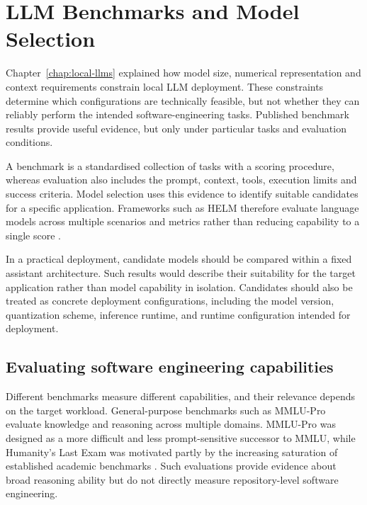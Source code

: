 \chapter{LLM Benchmarks and Model Selection}
\label{chap:benchmarks}

Chapter~\ref{chap:local-llms} explained how model size, numerical representation and context requirements constrain local LLM deployment. These constraints determine which configurations are technically feasible, but not whether they can reliably perform the intended software-engineering tasks. Published benchmark results provide useful evidence, but only under particular tasks and evaluation conditions.

A benchmark is a standardised collection of tasks with a scoring procedure, whereas evaluation also includes the prompt, context, tools, execution limits and success criteria. Model selection uses this evidence to identify suitable candidates for a specific application. Frameworks such as HELM therefore evaluate language models across multiple scenarios and metrics rather than reducing capability to a single score \parencite{liang2022helm}.

In a practical deployment, candidate models should be compared within a fixed assistant architecture. Such results would describe their suitability for the target application rather than model capability in isolation. Candidates should also be treated as concrete deployment configurations, including the model version, quantization scheme, inference runtime, and runtime configuration intended for deployment.

\section{Evaluating software engineering capabilities}
\label{sec:engineering-capabilities}

Different benchmarks measure different capabilities, and their relevance depends on the target workload. General-purpose benchmarks such as MMLU-Pro evaluate knowledge and reasoning across multiple domains. MMLU-Pro was designed as a more difficult and less prompt-sensitive successor to MMLU, while Humanity's Last Exam was motivated partly by the increasing saturation of established academic benchmarks \parencite{wang2024mmlupro,phan2025hle}. Such evaluations provide evidence about broad reasoning ability but do not directly measure repository-level software engineering.

